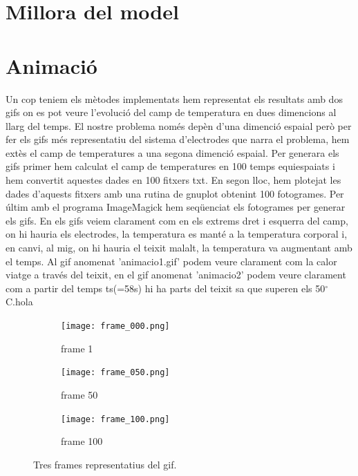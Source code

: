 \documentclass[11pt]{article}
\begin{document}
\section{Millora del model}




\section{Animació}
Un cop teniem els mètodes implementats hem representat els resultats amb dos gifs on es pot veure l'evolució del camp de temperatura en dues dimencions al llarg del temps. El nostre problema només depèn d'una dimenció espaial però per fer els gifs més representatiu del sistema d'electrodes que narra el problema, hem extès el camp de temperatures a una segona dimenció espaial. 
Per generara els gifs primer hem calculat el camp de temperatures en 100 temps equiespaiats i hem convertit aquestes dades en 100 fitxers txt. En segon lloc, hem plotejat les dades d'aquests fitxers amb una rutina de gnuplot obtenint 100 fotogrames. Per últim amb el programa ImageMagick hem seqüenciat els fotogrames per generar els gifs.
En els gifs veiem clarament com en els extrems dret i esquerra del camp, on hi hauria els electrodes, la temperatura es manté a la temperatura corporal i, en canvi, al mig, on hi hauria el teixit malalt, la temperatura va augmentant amb el temps. Al gif anomenat 'animacio1.gif' podem veure clarament com la calor viatge a través del teixit, en el gif anomenat 'animacio2' podem veure clarament com a partir del temps ts(=58s) hi ha parts del teixit sa que superen els 50$^\circ$C.hola



\begin{figure}[hbt!]
    \centering
    \begin{subfigure}{0.3\textwidth}
        \centering
        \texttt{[image: frame\_000.png]}
        \caption{frame 1}
    \end{subfigure}
    \hspace{0.01\textwidth}
    \begin{subfigure}{0.3\textwidth}
        \centering
        \texttt{[image: frame\_050.png]}
        \caption{frame 50}
    \end{subfigure}
    \hspace{0.01\textwidth}
    \begin{subfigure}{0.3\textwidth}
        \centering
        \texttt{[image: frame\_100.png]}
        \caption{frame 100}
    \end{subfigure}

    \caption{Tres frames representatius del gif.}
    \label{fig:dues_imatges}
\end{figure}
\end{document}
